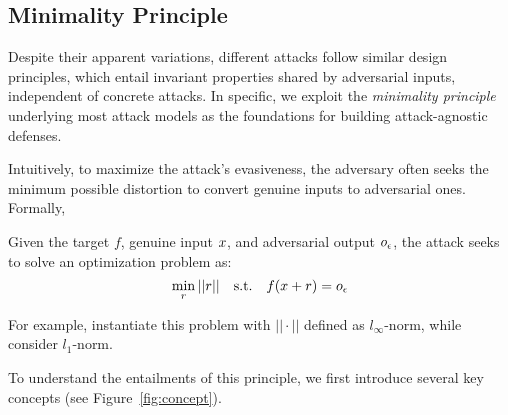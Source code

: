 

\subsection{Minimality Principle}
\label{sec:adefense}

Despite their apparent variations, different attacks follow similar design principles, which entail invariant properties shared by adversarial inputs, independent of concrete attacks. In specific, we exploit the
{\em minimality principle} underlying most attack models as the foundations for building attack-agnostic defenses.

Intuitively, to maximize the attack's evasiveness, the adversary often seeks the minimum possible distortion to convert genuine inputs to adversarial ones. Formally,
\begin{definition}
Given the target \dnn $f$, genuine input $x$, and adversarial output $o_\epsilon$, the attack seeks to solve an optimization problem as:
\begin{equation*}
\min_{r} ||r|| \quad \textrm{s.t.}\quad f(x + r) = o_\epsilon
\end{equation*}
\end{definition}
For example, \cite{Goodfellow:2014:arxiv,Huang:2015:arxiv} instantiate this problem with $||\cdot||$ defined as $l_\infty$-norm, while \cite{Papernot:2016:eurosp,Carlini:2016:arXiv} consider $l_1$-norm.

%

To understand the entailments of this principle, we first introduce several key concepts (see Figure~\ref{fig:concept}).


